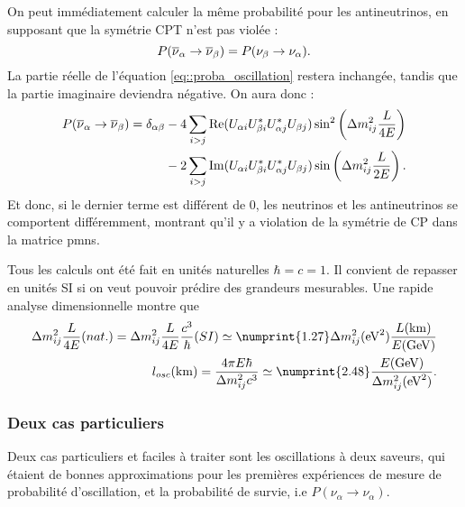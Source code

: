         On peut immédiatement calculer la même probabilité pour les antineutrinos, en supposant que la symétrie CPT n'est pas violée : 
        \begin{equation}
          P(\overline{\nu}_{\alpha}\to\overline{\nu}_{\beta}) = P(\nu_{\beta}\to\nu_{\alpha}).
        \end{equation}
        La partie réelle de l'équation \eqref{eq::proba_oscillation} restera inchangée, tandis que la partie imaginaire deviendra négative. On aura donc :
        \begin{equation}
          \begin{split}
            P(\overline{\nu}_{\alpha}\to\overline{\nu}_{\beta}) = \delta_{\alpha\beta} & - 4\sum_{i>j}\Re(U_{\alpha i}U_{\beta i}^*U_{\alpha j}^*U_{\beta j})\sin^2\left(\Delta m_{ij}^2\frac{L}{4E}\right) \\
            & -2\sum_{i>j}\Im(U_{\alpha i}U_{\beta i}^*U_{\alpha j}^*U_{\beta j})\sin\left(\Delta m_{ij}^2\frac{L}{2E}\right).
          \end{split}
        \end{equation}
        Et donc, si le dernier terme est différent de 0, les neutrinos et les antineutrinos se comportent différemment, montrant qu'il y a violation de la symétrie de CP dans la matrice \gls{pmns}.
        
        Tous les calculs ont été fait en unités naturelles $\hbar = c = 1$. Il convient de repasser en unités SI si on veut pouvoir prédire des grandeurs mesurables. Une rapide analyse dimensionnelle montre que 
        \begin{eqnarray}
          \Delta m_{ij}^2\frac{L}{4E}(nat.)
          = \Delta m_{ij}^2\frac{L}{4E}\frac{c^3}{\hbar}(SI)
          \simeq \numprint{1.27}\Delta m_{ij}^2(\si{\electronvolt\squared})\frac{L(\si{\kilo\meter})}{E(\si{\giga\electronvolt})} \\ 
          l_{osc}(\si{\kilo\meter}) = \frac{4\pi E\hbar}{\Delta m_{ij}^2c^3} \simeq \numprint{2.48}\frac{E(\si{\giga\electronvolt})}{\Delta m_{ij}^2(\si{\electronvolt\squared})}.
        \end{eqnarray}

      \subsubsection{Deux cas particuliers}
        Deux cas particuliers et faciles à traiter sont les oscillations à deux saveurs, qui étaient de bonnes approximations pour les premières expériences de mesure de probabilité d'oscillation, et la probabilité de survie, i.e $P(\nu_{\alpha}\to\nu_{\alpha})$.
        
